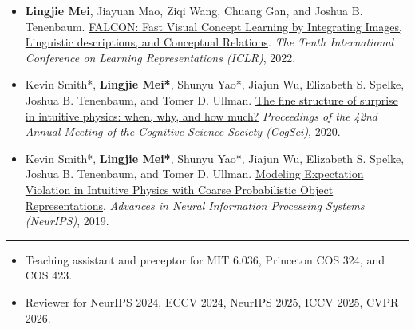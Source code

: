 \documentclass[10pt]{article}
\newcommand{\mysection}[1]{\vspace{4pt}\noindent{\large\bfseries #1}\par\vspace{-2pt}\hrule\vspace{3pt}}
\begin{document}
\begin{itemize}
    \item \textbf{Lingjie Mei}, Jiayuan Mao, Ziqi Wang, Chuang Gan, and Joshua B. Tenenbaum.
    \href{https://openreview.net/forum?id=htWIlvDcY8}{FALCON: Fast Visual Concept Learning by Integrating Images, Linguistic descriptions, and Conceptual Relations}.
    \textit{The Tenth International Conference on Learning Representations (ICLR)}, 2022.

    \item Kevin Smith*, \textbf{Lingjie Mei*}, Shunyu Yao*, Jiajun Wu, Elizabeth S. Spelke, Joshua B. Tenenbaum, and Tomer D. Ullman.
    \href{https://escholarship.org/uc/item/07t8021w}{The fine structure of surprise in intuitive physics: when, why, and how much?}
    \textit{Proceedings of the 42nd Annual Meeting of the Cognitive Science Society (CogSci)}, 2020.

    \item Kevin Smith*, \textbf{Lingjie Mei*}, Shunyu Yao*, Jiajun Wu, Elizabeth S. Spelke, Joshua B. Tenenbaum, and Tomer D. Ullman.
    \href{https://proceedings.neurips.cc/paper/2019/hash/e88f243bf341ded9b4ced444795c3f17-Abstract.html}{Modeling Expectation Violation in Intuitive Physics with Coarse Probabilistic Object Representations}.
    \textit{Advances in Neural Information Processing Systems (NeurIPS)}, 2019.
\end{itemize}



\mysection{SERVICE}
\begin{itemize}[noitemsep, nolistsep, leftmargin=*]
    \item Teaching assistant and preceptor for MIT 6.036, Princeton COS 324, and COS 423.
    \item Reviewer for NeurIPS 2024, ECCV 2024, NeurIPS 2025, ICCV 2025, CVPR 2026.
\end{itemize}
\end{document}
